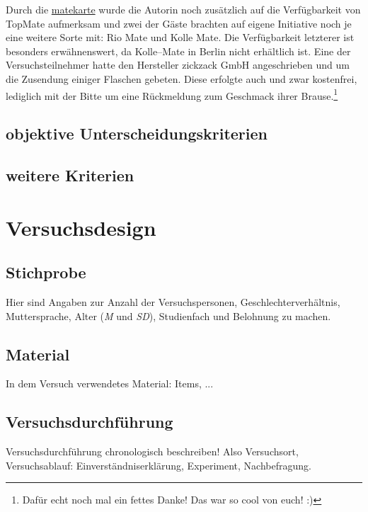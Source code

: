 \documentclass[11pt,a4paper,ngerman]{article}
\begin{document}
Durch die \href{http://www.matekarte.de/}{matekarte} wurde die Autorin noch zusätzlich auf die Verfügbarkeit von TopMate aufmerksam und zwei der Gäste brachten auf eigene Initiative noch je eine weitere Sorte mit: Rio Mate und Kolle Mate. Die Verfügbarkeit letzterer ist besonders erwähnenswert, da Kolle--Mate in Berlin nicht erhältlich ist. Eine der Versuchsteilnehmer hatte den Hersteller zickzack GmbH angeschrieben und um die Zusendung einiger Flaschen gebeten. Diese erfolgte auch und zwar kostenfrei, lediglich mit der Bitte um eine Rückmeldung zum Geschmack ihrer Brause.\footnote{Dafür echt noch mal ein fettes Danke! Das war so cool von euch! :)\footnotemark}

\subsection{objektive Unterscheidungskriterien}


\subsection{weitere Kriterien}

\section{Versuchsdesign}


\subsection{Stichprobe}\label{sec:stichprobe}
Hier sind Angaben zur Anzahl der Versuchspersonen, Geschlechterverhältnis, Muttersprache, Alter (\textit{M} und \textit{SD}), Studienfach und Belohnung zu machen.



\subsection{Material} %
In dem Versuch verwendetes Material: Items, ... 



\subsection{Versuchsdurchführung} %
Versuchsdurchführung chronologisch beschreiben! Also Versuchsort, Versuchsablauf: Einverständniserklärung, Experiment, Nachbefragung.
\end{document}
